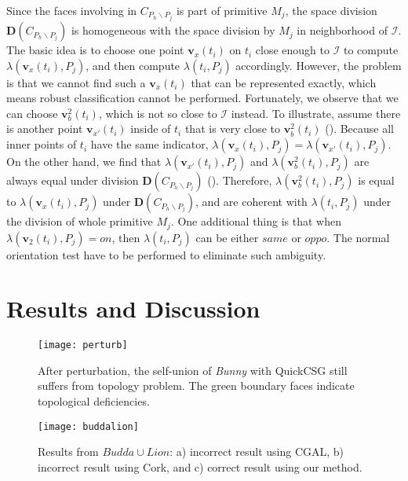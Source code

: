 Since the faces involving in $C_{P_h \backslash P_j}$ is part of primitive $M_j$, the space division $\boldsymbol{D}(C_{P_h \backslash P_j})$ is homogeneous with the space division by $M_j$ in neighborhood of $\bm{\mathcal{I}}$. The basic idea is to choose one point $\bm{v}_x(t_i)$ on $t_i$ close enough to $\bm{\mathcal{I}}$ to compute $\lambda(\bm{v}_x(t_i), P_j)$, and then compute $\lambda(t_i, P_j)$ accordingly. However, the problem is that we cannot find such a $\bm{v}_x(t_i)$ that can be represented exactly, which means robust classification cannot be performed. Fortunately, we observe that we can choose $\bm{v}_b^2(t_i)$, which is not so close to $\bm{\mathcal{I}}$ instead. To illustrate, assume there is another point $\bm{v}_{x'}(t_i)$ inside of $t_i$ that is very close to $\bm{v}_b^2(t_i)$ ({\color{red}{Fig. x}}). Because all inner points of $t_i$ have the same indicator, $\lambda(\bm{v}_x(t_i), P_j) = \lambda(\bm{v}_{x'}(t_i), P_j)$. On the other hand, we find that $\lambda(\bm{v}_{x'}(t_i), P_j)$ and $\lambda(\bm{v}_b^2(t_i), P_j)$ are always equal under division $\boldsymbol{D}(C_{P_h \backslash P_j})$ ({}). Therefore, $\lambda(\bm{v}_b^2(t_i), P_j)$ is equal to $\lambda(\bm{v}_x(t_i), P_j)$ under $\boldsymbol{D}(C_{P_h \backslash P_j})$, and are coherent with $\lambda(t_i, P_j)$ under the division of whole primitive $M_j$. One additional thing is that when $\lambda(\bm{v}_2(t_i), P_j)=on$, then $\lambda(t_i, P_j)$ can be either $same$ or $oppo$. The normal orientation test have to be performed to eliminate such ambiguity.

\fi

\section{Results and Discussion}


\begin{figure}[t]
\centering
\texttt{[image: perturb]}
\caption{After perturbation, the self-union of \emph{Bunny} with QuickCSG still suffers from topology problem. The green boundary faces indicate topological deficiencies.}
%
\label{fig:boundaryedge}
\end{figure}

\begin{figure}[t]
\centering
\texttt{[image: buddalion]}
\caption{ Results from $Budda\cup Lion$: a) incorrect result using CGAL, b) incorrect result using Cork, and c) correct result using our method. }
\label{fig:buddalion}
\end{figure}


